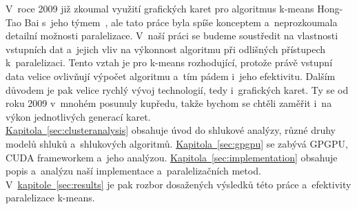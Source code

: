 V~roce 2009 již zkoumal využití grafických karet pro algoritmus k-means Hong-Tao Bai s~jeho týmem~\cite{Hong09}, ale tato práce byla spíše konceptem a~neprozkoumala detailní možnosti paralelizace.
V~naší práci se budeme soustředit na vlastnosti vstupních dat a~jejich vliv na výkonnost algoritmu při odlišných přístupech k~paralelizaci. Tento vztah je pro k-means rozhodující, protože právě vstupní data velice ovlivňují výpočet algoritmu a~tím pádem i~jeho efektivitu.
Dalším důvodem je pak velice rychlý vývoj technologií, tedy i~grafických karet. Ty se od roku 2009 v~mnohém posunuly kupředu, takže bychom se chtěli zaměřit i~na výkon jednotlivých generací karet.\\

\hyperref[sec:clusteranalysis]{Kapitola~\ref*{sec:clusteranalysis}} obsahuje úvod do shlukové analýzy, různé druhy modelů shluků a~shlukových algoritmů. \hyperref[sec:gpgpu]{Kapitola~\ref*{sec:gpgpu}} se zabývá GPGPU, CUDA frameworkem a~jeho analýzou. \hyperref[sec:implementation]{Kapitola~\ref*{sec:implementation}} obsahuje popis a~analýzu naší implementace a~paralelizačních metod. V~\hyperref[sec:results]{kapitole~\ref*{sec:results}} je pak rozbor dosažených výsledků této práce a~efektivity paralelizace k-means.
